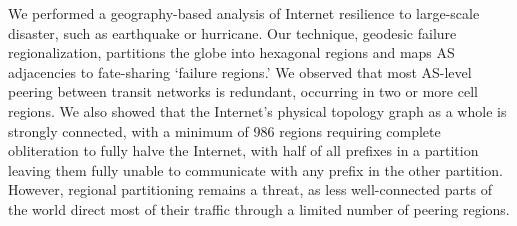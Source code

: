     We performed a geography-based analysis of Internet resilience to large-scale disaster, such as earthquake or hurricane.
    Our technique, geodesic failure regionalization, partitions the globe into hexagonal regions and maps AS adjacencies to fate-sharing `failure regions.'
    We observed that most AS-level peering between transit networks is redundant, occurring in two or more cell regions.
    We also showed that the Internet's physical topology graph as a whole is strongly connected, with a minimum of 986 regions requiring complete obliteration to fully halve the Internet, with half of all prefixes in a partition leaving them fully unable to communicate with any prefix in the other partition.
    However, regional partitioning remains a threat, as less well-connected parts of the world direct most of their traffic through a limited number of peering regions. 
